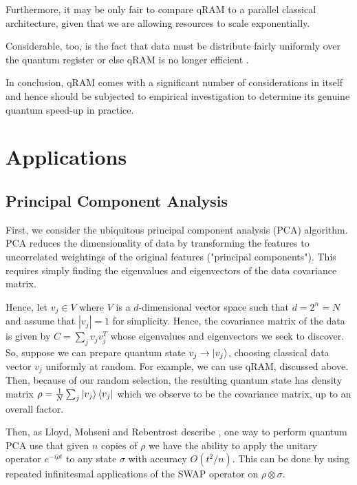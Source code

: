 \documentclass[12]{amsart}
\newcommand\0{\mathbf{0}}
\newcommand\<{\langle}
\renewcommand\>{\rangle}
\begin{document}
Furthermore, it may be only fair to compare qRAM to a parallel classical architecture, given that we are allowing resources to scale exponentially. 

Considerable, too, is the fact that data must be distribute fairly uniformly over the quantum register or else qRAM is no longer efficient \cite{aaronson2015read}. 

In conclusion, qRAM comes with a significant number of considerations in itself and hence should be subjected to empirical investigation to determine its genuine quantum speed-up in practice. 


\section{Applications}

\subsection{Principal Component Analysis}

First, we consider the ubiquitous principal component analysis (PCA) algorithm. PCA reduces the dimensionality of data by transforming the features to uncorrelated weightings of the original features ("principal components"). This requires simply finding the eigenvalues and eigenvectors of the data covariance matrix. 

Hence, let $v_j \in V$ where $V$ is a $d$-dimensional vector space such that $d=2^n=N$ and assume that $|v_j| = 1$ for simplicity. Hence, the covariance matrix of the data is given by $C = \sum_j v_jv_j^T$ whose eigenvalues and eigenvectors we seek to discover. So, suppose we can prepare quantum state $v_j \rightarrow \ket{v_j}$, choosing classical data vector $v_j$ uniformly at random. For example, we can use qRAM, discussed above. Then, because of our random selection, the resulting quantum state has density matrix $\rho = \frac{1}{N} \sum_j \ket{v_j}\bra{v_j}$ which we observe to be the covariance matrix, up to an overall factor. 

Then, as Lloyd, Mohseni and Rebentrost describe \cite{lloyd2014quantum}, one way to perform quantum PCA use that given $n$ copies of $\rho$ we have the ability to apply the unitary operator $e^{-i\rho t}$ to any state $\sigma$ with accuracy $O(t^2 / n)$. This can be done by using repeated infinitesmal applications of the SWAP operator on $\rho \otimes \sigma$. 
\end{document}
